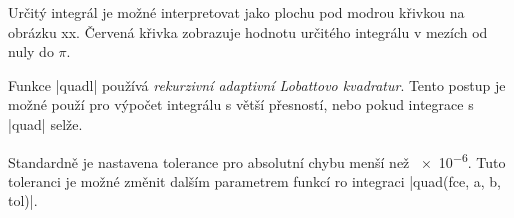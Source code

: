   Určitý integrál je možné interpretovat jako plochu pod modrou křivkou na obrázku xx. Červená
  křivka zobrazuje hodnotu určitého integrálu v mezích od nuly do \(\pi\).

  Funkce |quadl| používá \emph{rekurzivní adaptivní Lobattovo kvadratur}. Tento postup je možné
  použí pro výpočet integrálu s větší přesností, nebo pokud integrace s |quad| selže. 

  Standardně je nastavena tolerance pro absolutní chybu menší než \num{e-6}. Tuto toleranci je možné
  změnit dalším parametrem funkcí ro integraci |quad(fce, a, b, tol)|.


